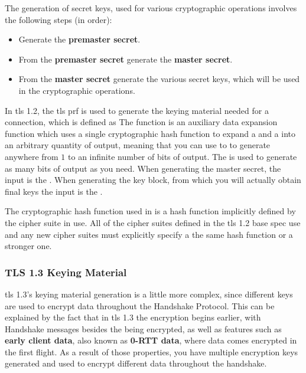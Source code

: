 \documentclass{llncs}
\begin{document}
The generation of secret keys, used for various cryptographic operations involves the
following steps (in order):

\begin{itemize}
  \item Generate the \textbf{premaster secret}.
  \item From the \textbf{premaster secret} generate the \textbf{master secret}.
  \item From the \textbf{master secret} generate the various secret keys, which
  will be used in the cryptographic operations.
\end{itemize}

In \gls{tls} 1.2, the \gls{tls} \gls{prf} is used to generate the keying material
needed for a connection, which is defined as 
The  function is an auxiliary data expansion function
which uses a single cryptographic hash function to expand a  and a 
into an arbitrary quantity of output, meaning that you can use to to generate
anywhere from $1$ to an infinite number of bits of output. The 
is used to generate as many bits of output as you need. When generating the
master secret, the  input is the .
When generating the key block, from which you will actually obtain final keys
the  input is the .

The cryptographic hash function used in  is
a hash function implicitly defined by the cipher suite in use. All of the cipher
suites defined in the \gls{tls} 1.2 base spec use  and any new
cipher suites must explicitly specify a the same hash function or a stronger one.

\subsubsection{TLS 1.3 Keying Material}

\gls{tls} 1.3's keying material generation is a little more complex, since different
keys are used to encrypt data throughout the Handshake Protocol. This can be
explained by the fact that in \gls{tls} 1.3 the encryption begins earlier, with
Handshake messages besides the  being encrypted,
as well as features such as \textbf{early client data}, also known as \textbf{0-RTT data},
where data comes encrypted in the first flight. As a result of those properties,
you have multiple encryption keys generated and used to encrypt different data
throughout the handshake.
\end{document}
